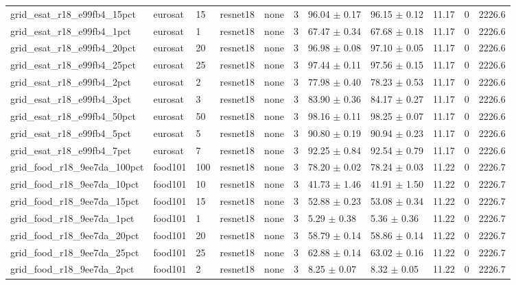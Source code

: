 \begin{tabular}{lllllllllll}
grid_esat_r18_e99fb4_15pct & eurosat & 15 & resnet18 & none & 3 & 96.04 $\pm$ 0.17 & 96.15 $\pm$ 0.12 & 11.17 & 0 & 2226.6 \\
grid_esat_r18_e99fb4_1pct & eurosat & 1 & resnet18 & none & 3 & 67.47 $\pm$ 0.34 & 67.68 $\pm$ 0.18 & 11.17 & 0 & 2226.6 \\
grid_esat_r18_e99fb4_20pct & eurosat & 20 & resnet18 & none & 3 & 96.98 $\pm$ 0.08 & 97.10 $\pm$ 0.05 & 11.17 & 0 & 2226.6 \\
grid_esat_r18_e99fb4_25pct & eurosat & 25 & resnet18 & none & 3 & 97.44 $\pm$ 0.11 & 97.56 $\pm$ 0.15 & 11.17 & 0 & 2226.6 \\
grid_esat_r18_e99fb4_2pct & eurosat & 2 & resnet18 & none & 3 & 77.98 $\pm$ 0.40 & 78.23 $\pm$ 0.53 & 11.17 & 0 & 2226.6 \\
grid_esat_r18_e99fb4_3pct & eurosat & 3 & resnet18 & none & 3 & 83.90 $\pm$ 0.36 & 84.17 $\pm$ 0.27 & 11.17 & 0 & 2226.6 \\
grid_esat_r18_e99fb4_50pct & eurosat & 50 & resnet18 & none & 3 & 98.16 $\pm$ 0.11 & 98.25 $\pm$ 0.07 & 11.17 & 0 & 2226.6 \\
grid_esat_r18_e99fb4_5pct & eurosat & 5 & resnet18 & none & 3 & 90.80 $\pm$ 0.19 & 90.94 $\pm$ 0.23 & 11.17 & 0 & 2226.6 \\
grid_esat_r18_e99fb4_7pct & eurosat & 7 & resnet18 & none & 3 & 92.25 $\pm$ 0.84 & 92.54 $\pm$ 0.79 & 11.17 & 0 & 2226.6 \\
grid_food_r18_9ee7da_100pct & food101 & 100 & resnet18 & none & 3 & 78.20 $\pm$ 0.02 & 78.24 $\pm$ 0.03 & 11.22 & 0 & 2226.7 \\
grid_food_r18_9ee7da_10pct & food101 & 10 & resnet18 & none & 3 & 41.73 $\pm$ 1.46 & 41.91 $\pm$ 1.50 & 11.22 & 0 & 2226.7 \\
grid_food_r18_9ee7da_15pct & food101 & 15 & resnet18 & none & 3 & 52.88 $\pm$ 0.23 & 53.08 $\pm$ 0.34 & 11.22 & 0 & 2226.7 \\
grid_food_r18_9ee7da_1pct & food101 & 1 & resnet18 & none & 3 & 5.29 $\pm$ 0.38 & 5.36 $\pm$ 0.36 & 11.22 & 0 & 2226.7 \\
grid_food_r18_9ee7da_20pct & food101 & 20 & resnet18 & none & 3 & 58.79 $\pm$ 0.14 & 58.86 $\pm$ 0.14 & 11.22 & 0 & 2226.7 \\
grid_food_r18_9ee7da_25pct & food101 & 25 & resnet18 & none & 3 & 62.88 $\pm$ 0.14 & 63.02 $\pm$ 0.16 & 11.22 & 0 & 2226.7 \\
grid_food_r18_9ee7da_2pct & food101 & 2 & resnet18 & none & 3 & 8.25 $\pm$ 0.07 & 8.32 $\pm$ 0.05 & 11.22 & 0 & 2226.7 \\

\end{tabular}
